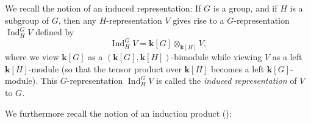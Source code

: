 \documentclass[numbers=enddot,12pt,final,onecolumn,notitlepage]{scrartcl}%
\theoremstyle{definition}
\begin{document}
We recall the notion of an induced representation: If $G$ is a group, and if
$H$ is a subgroup of $G$, then any $H$-representation $V$ gives rise to a
$G$-representation $\operatorname*{Ind}\nolimits_{H}^{G}V$ defined by%
\begin{equation}
\operatorname*{Ind}\nolimits_{H}^{G}V=\mathbf{k}\left[  G\right]
\otimes_{\mathbf{k}\left[  H\right]  }V, \label{eq.IndGH.def}%
\end{equation}
where we view $\mathbf{k}\left[  G\right]  $ as a $\left(  \mathbf{k}\left[
G\right]  ,\mathbf{k}\left[  H\right]  \right)  $-bimodule while viewing $V$
as a left $\mathbf{k}\left[  H\right]  $-module (so that the tensor product
over $\mathbf{k}\left[  H\right]  $ becomes a left $\mathbf{k}\left[
G\right]  $-module). This $G$-representation $\operatorname*{Ind}%
\nolimits_{H}^{G}V$ is called the \emph{induced representation} of $V$ to $G$.

We furthermore recall the notion of an induction product (\cite[\S 7.3]%
{Fulton97}):
\end{document}
